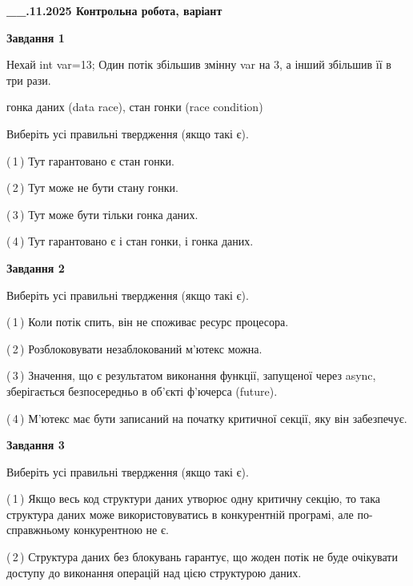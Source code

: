 \documentclass[12pt, ukrainian]{article}
\begin{document}
\begin {large}

\textbf{\_\_.11.2025 Контрольна робота, варіант  }\par


{

\begin{center}
\textbf{Завдання 1}
\end{center}
Нехай int var=13; Один потік збільшив змінну var на 3, а інший збільшив її в три рази.

гонка даних (data race), стан гонки (race condition)

Виберіть усі правильні твердження (якщо такі є).\par
\vspace{2mm}
(\,1\,) Тут гарантовано є стан гонки.%

(\,2\,) Тут може не бути стану гонки.%

(\,3\,) Тут може бути тільки гонка даних.%

(\,4\,) Тут гарантовано є і стан гонки, і гонка даних.%



\begin{center}
\textbf{Завдання 2}
\end{center}
Виберіть усі правильні твердження (якщо такі є).\par
\vspace{2mm}

(\,1\,) Коли потік спить, він не споживає ресурс процесора.%

(\,2\,) Розблоковувати незаблокований м’ютекс можна.%

(\,3\,) Значення, що є результатом виконання функції, запущеної через async, зберігається безпосередньо в об’єкті ф’ючерса (future).%

(\,4\,) М’ютекс має бути записаний на початку критичної секції, яку він забезпечує.%



\begin{center}
\textbf{Завдання 3}
\end{center}
Виберіть усі правильні твердження (якщо такі є).\par
\vspace{2mm}

(\,1\,) Якщо весь код структури даних утворює одну критичну секцію, то така структура даних може використовуватись в конкурентній програмі, але по-справжньо\-му конкурентною не є.%

(\,2\,) Структура даних без блокувань гарантує, що жоден потік не буде очікувати доступу до виконання операцій над цією структурою даних.%

}
\end{large}
\end{document}
